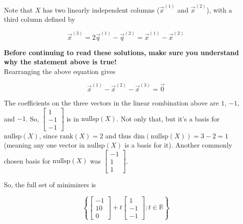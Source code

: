 \documentclass[11pt]{article}
\begin{document}
\begin{prob}
\begin{subprob}
\begin{solution}
Note that $X$ has two linearly independent columns ($\vec x^{(1)}$ and $\vec x^{(2)}$), with a third column defined by

$$\vec x^{(3)} = 2 \vec q^{(1)}-\vec q^{(2)} = \vec x^{(1)} - \vec x^{(2)}$$

\textbf{Before continuing to read these solutions, make sure you understand why the statement above is true!} \\

Rearranging the above equation gives

$$\vec x^{(1)} - \vec x^{(2)} - \vec x^{(3)} = \vec 0$$

The coefficients on the three vectors in the linear combination above are $1$, $-1$, and $-1$. So, $\begin{bmatrix} 1 \\ -1 \\ -1 \end{bmatrix}$ is in $\text{nullsp}(X)$. Not only that, but it's a basis for $\text{nullsp}(X)$, since $\text{rank}(X) = 2$ and thus $\text{dim}(\text{nullsp}(X)) = 3-2 = 1$ (meaning any one vector in $\text{nullsp}(X)$ is a basis for it). Another commonly chosen basis for $\text{nullsp}(X)$ was $\begin{bmatrix} -1 \\ 1 \\ 1 \end{bmatrix}$.

So, the full set of minimizers is

$$\boxed{\left\{ \begin{bmatrix}-1\\10\\0\end{bmatrix} + t \begin{bmatrix}1\\-1\\-1\end{bmatrix} : t \in \mathbb{R} \right\}}$$
\end{solution}
\end{subprob}

\end{prob}

\newpage
\end{document}
